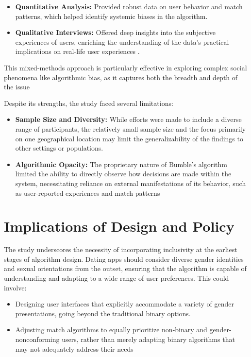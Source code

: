 \begin{itemize}
    \item \textbf{Quantitative Analysis:} Provided robust data on user behavior and match patterns, which helped identify systemic biases in the algorithm. 
    \item \textbf{Qualitative Interviews:} Offered deep insights into the subjective experiences of users, enriching the understanding of the data's practical implications on real-life user experiences \cite{Kalra_Gupta_Varghese_Rangaswamy_2023}.
\end{itemize}
This mixed-methods approach is particularly effective in exploring complex social phenomena like algorithmic bias, as it captures both the breadth and depth of the issue \cite{Creswell_2009}

Despite its strengths, the study faced several limitations:

\begin{itemize}
    \item \textbf{Sample Size and Diversity:} While efforts were made to include a diverse range of participants, the relatively small sample size and the focus primarily on one geographical location may limit the generalizability of the findings to other settings or populations.
    \item \textbf{Algorithmic Opacity:} The proprietary nature of Bumble’s algorithm limited the ability to directly observe how decisions are made within the system, necessitating reliance on external manifestations of its behavior, such as user-reported experiences and match patterns 
\end{itemize}

\section{Implications of Design and Policy}
The study underscores the necessity of incorporating inclusivity at the earliest stages of algorithm design. Dating apps should consider diverse gender identities and sexual orientations from the outset, ensuring that the algorithm is capable of understanding and adapting to a wide range of user preferences. This could involve:

\begin{itemize}
    \item Designing user interfaces that explicitly accommodate a variety of gender presentations, going beyond the traditional binary options.
    \item Adjusting match algorithms to equally prioritize non-binary and gender-nonconforming users, rather than merely adapting binary algorithms that may not adequately address their needs \cite{Kalra_Gupta_Varghese_Rangaswamy_2023}
\end{itemize}

